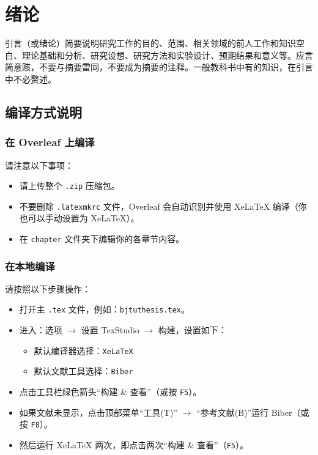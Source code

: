\cleardoublepage{}

\chapter{绪论}
引言（或绪论）简要说明研究工作的目的、范围、相关领域的前人工作和知识空白、理论基础和分析、研究设想、研究方法和实验设计、预期结果和意义等。应言简意赅，不要与摘要雷同，不要成为摘要的注释。一般教科书中有的知识，在引言中不必赘述。

\section{编译方式说明}

\subsection*{在 Overleaf 上编译}

请注意以下事项：

\begin{itemize}
  \item 请上传整个 \verb|.zip| 压缩包。
  \item 不要删除 \verb|.latexmkrc| 文件，Overleaf 会自动识别并使用 XeLaTeX 编译（你也可以手动设置为 XeLaTeX）。
  \item 在 \verb|chapter| 文件夹下编辑你的各章节内容。
\end{itemize}

\subsection*{在本地编译}

请按照以下步骤操作：

\begin{itemize}
  \item 打开主 \verb|.tex| 文件，例如：\verb|bjtuthesis.tex|。
  \item 进入：选项 $\rightarrow$ 设置 TexStudio $\rightarrow$ 构建，设置如下：
    \begin{itemize}
      \item 默认编译器选择：\verb|XeLaTeX|
      \item 默认文献工具选择：\verb|Biber|
    \end{itemize}
  \item 点击工具栏绿色箭头“构建 \& 查看”（或按 \verb|F5|）。
  \item 如果文献未显示，点击顶部菜单“工具(T)” $\rightarrow$ “参考文献(B)”运行 Biber（或按 \verb|F8|）。
  \item 然后运行 XeLaTeX 两次，即点击两次“构建 \& 查看”（\verb|F5|）。
\end{itemize}

